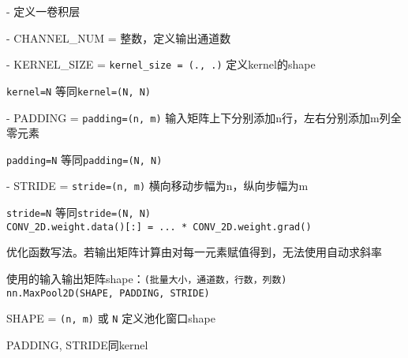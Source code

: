 \documentclass[UTF8]{ctexart}
\begin{document}
  - 定义一卷积层

  - CHANNEL\_NUM = 整数，定义输出通道数

  - KERNEL\_SIZE = \texttt{kernel\_size = (., .)} 定义kernel的shape

  \quad \texttt{kernel=N} 等同\texttt{kernel=(N, N)}
  
  - PADDING = \texttt{padding=(n, m)}  输入矩阵上下分别添加n行，左右分别添加m列全零元素

  \quad \texttt{padding=N} 等同\texttt{padding=(N, N)}
  
  - STRIDE = \texttt{stride=(n, m)} 横向移动步幅为n，纵向步幅为m
  
  \quad \texttt{stride=N} 等同\texttt{stride=(N, N)}\\
\texttt{CONV\_2D.weight.data()[:] = ... * CONV\_2D.weight.grad()}

  优化函数写法。若输出矩阵计算由对每一元素赋值得到，无法使用自动求斜率
  
  使用的输入输出矩阵shape：\texttt{(批量大小，通道数，行数，列数)}\\
\texttt{nn.MaxPool2D(SHAPE, PADDING, STRIDE)}

  SHAPE = \texttt{(n, m)} 或 \texttt{N} 定义池化窗口shape

  PADDING, STRIDE同kernel\\
\texttt{}
\end{document}
